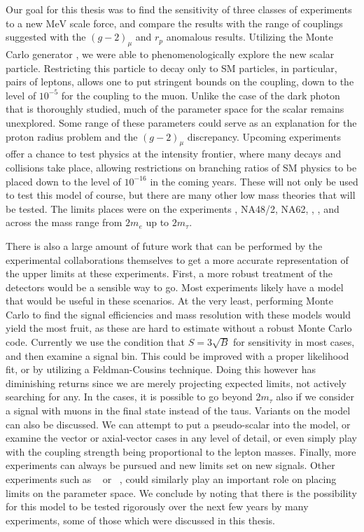 \label{chapter:conclusion}

Our goal for this thesis was to find the sensitivity of three classes of experiments to a new $\textrm{MeV}$ scale force, and compare the results with the range of couplings suggested with the $(g-2)_\mu$ and $r_p$ anomalous results.
Utilizing the Monte Carlo generator \madgraph, we were able to phenomenologically explore the new scalar particle.
Restricting this particle to decay only to SM particles, in particular, pairs of leptons, allows one to put stringent bounds on the coupling, down to the level of $10^{-5}$ for the coupling to the muon.
Unlike the case of the dark photon that is thoroughly studied, much of the parameter space for the scalar remains unexplored.
Some range of these parameters could serve as an explanation for the proton radius problem and the $(g-2)_\mu$ discrepancy.
Upcoming experiments offer a chance to test physics at the intensity frontier, where many decays and collisions take place, allowing restrictions on branching ratios of SM physics to be placed down to the level of $10^{-16}$ in the coming years.
These will not only be used to test this model of course, but there are many other low mass theories that will be tested.
The limits places were on the experiments \mueee, NA48/2, NA62, \babar, \belle, and \belletwo across the mass range from $2m_e$ up to $2m_\tau$.

There is also a large amount of future work that can be performed by the experimental collaborations themselves to get a more accurate representation of the upper limits at these experiments.
First, a more robust treatment of the detectors would be a sensible way to go.
Most experiments likely have a \geant model that would be useful in these scenarios.
At the very least, performing Monte Carlo to find the signal efficiencies and mass resolution with these models would yield the most fruit, as these are hard to estimate without a robust Monte Carlo code.
Currently we use the condition that $S = 3\sqrt{B}$ for sensitivity in most cases, and then examine a signal bin.
This could be improved with a proper likelihood fit, or by utilizing a Feldman-Cousins technique.
Doing this however has diminishing returns since we are merely projecting expected limits, not actively searching for any.
In the \belletwo cases, it is possible to go beyond $2m_\tau$ also if we consider a signal with muons in the final state instead of the taus.
Variants on the model can also be discussed.
We can attempt to put a pseudo-scalar into the model, or examine the vector or axial-vector cases in any level of detail, or even simply play with the coupling strength being proportional to the lepton masses.
Finally, more experiments can always be pursued and new limits set on new signals.
Other experiments such as \mutoe~\cite{Abrams:2012er} or \comet~\cite{Cui:2009zz}, could similarly play an important role on placing limits on the parameter space.
We conclude by noting that there is the possibility for this model to be tested rigorously over the next few years by many experiments, some of those which were discussed in this thesis.
